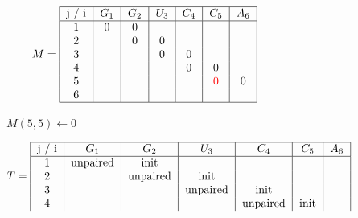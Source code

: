 \begin{figure}[H]
    \centering
    \begin{subfigure}[t]{0.25\textwidth}
        \scriptsize \[
                        M =  \begin{tabular}{|c|c|c|c|c|c|c|}
                                 \hline
                                 j / i & $G_1$ & $G_2$ & $U_3$ & $C_4$ & $C_5$              & $A_6$ \\ \hline
                                 1     & 0     & 0     &       &       &                    &       \\
                                 2     &       & 0     & 0     &       &                    &       \\
                                 3     &       &       & 0     & 0     &                    &       \\
                                 4     &       &       &       & 0     & 0                  &       \\
                                 5     &       &       &       &       & \textcolor{red}{0} & 0     \\
                                 6     &       &       &       &       &                    &       \\ \hline
                        \end{tabular}
        \]
        \caption{$M(5,5) \gets 0$}
    \end{subfigure}
    \hfill
    \begin{subfigure}[t]{0.65\textwidth}
        \scriptsize \[
                        T =     \begin{tabular}{|c|c|c|c|c|c|c|}
                                    \hline
                                    j / i & $G_1$    & $G_2$    & $U_3$    & $C_4$    & $C_5$                     & $A_6$ \\ \hline
                                    1     & unpaired & init     &          &          &                           &       \\
                                    2     &          & unpaired & init     &          &                           &       \\
                                    3     &          &          & unpaired & init     &                           &       \\
                                    4     &          &          &          & unpaired & init                      &       \\

\end{tabular}\]
\end{subfigure}
\end{figure}
